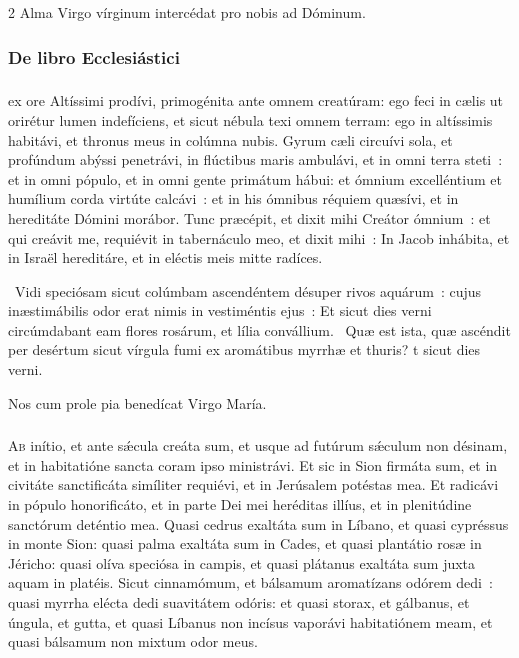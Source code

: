 \documentclass[9pt,twoside]{extarticle}
\begin{document}
\begin{multicols}{2}
\medskip
{\small {} Alma Virgo vírginum intercédat pro nobis ad Dóminum.}
\subsubsection*{\center \normalfont De libro Ecclesiástici}
\subsubsection*{}
 ex ore Altíssimi prodívi, primogénita ante omnem creatúram:
ego feci in cælis ut orirétur lumen indefíciens, et sicut nébula texi omnem terram:
ego in altíssimis habitávi, et thronus meus in colúmna nubis.
Gyrum cæli circuívi sola, et profúndum abýssi penetrávi, in flúctibus maris ambulávi,
et in omni terra steti~: et in omni pópulo,
et in omni gente primátum hábui:
et ómnium excelléntium et humílium corda virtúte calcávi~: et in his ómnibus réquiem quæsívi, et in hereditáte Dómini morábor.
Tunc præcépit, et dixit mihi Creátor ómnium~: et qui creávit me, requiévit in tabernáculo meo,
et dixit mihi~: In Jacob inhábita, et in Israël hereditáre, et in eléctis meis mitte radíces.

~Vidi speciósam sicut colúmbam ascendéntem désuper rivos aquárum~: cujus inæstimábilis odor erat nimis in vestiméntis ejus~: \textred{*} Et sicut dies verni circúmdabant eam flores rosárum, et lília convállium. ~Quæ est ista, quæ ascéndit per desértum sicut vírgula fumi ex aromátibus myrrhæ et thuris? t sicut dies verni.

\medskip
{\small {} Nos cum prole pia benedícat Virgo María.}
\subsubsection*{\center {}}
\lettrine{A}{b} inítio, et ante sǽcula creáta sum, et usque ad futúrum sǽculum non désinam, et in habitatióne sancta coram ipso ministrávi.
Et sic in Sion firmáta sum, et in civitáte sanctificáta simíliter requiévi, et in Jerúsalem potéstas mea.
Et radicávi in pópulo honorificáto, et in parte Dei mei heréditas illíus, et in plenitúdine sanctórum deténtio mea.
Quasi cedrus exaltáta sum in Líbano, et quasi cypréssus in monte Sion:
quasi palma exaltáta sum in Cades, et quasi plantátio rosæ in Jéricho:
quasi olíva speciósa in campis, et quasi plátanus exaltáta sum juxta aquam in platéis.
Sicut cinnamómum, et bálsamum aromatízans odórem dedi~: quasi myrrha elécta dedi suavitátem odóris:
et quasi storax, et gálbanus, et úngula, et gutta, et quasi Líbanus non incísus vaporávi habitatiónem meam, et quasi bálsamum non mixtum odor meus.


\end{multicols}
\end{document}
